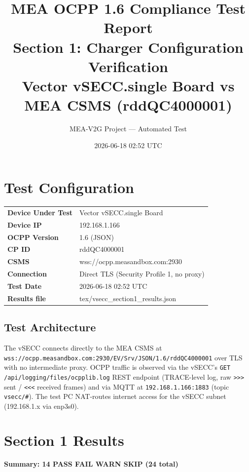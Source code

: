 \documentclass[10pt, a4paper]{article}
\title{\textbf{MEA OCPP 1.6 Compliance Test Report}\\[0.3em]
\large Section 1: Charger Configuration Verification\\[0.3em]
\normalsize Vector vSECC.single Board vs MEA CSMS (rddQC4000001)}
\author{MEA-V2G Project --- Automated Test}
\date{2026-06-18 02:52 UTC}
\begin{document}
\maketitle
\tableofcontents
\newpage

\section{Test Configuration}
\begin{tabular}{ll}
\textbf{Device Under Test} & Vector vSECC.single Board \\
\textbf{Device IP}         & 192.168.1.166 \\
\textbf{OCPP Version}      & 1.6 (JSON) \\
\textbf{CP ID}             & rddQC4000001 \\
\textbf{CSMS}              & wss://ocpp.measandbox.com:2930 \\
\textbf{Connection}        & Direct TLS (Security Profile 1, no proxy) \\
\textbf{Test Date}         & 2026-06-18 02:52 UTC \\
\textbf{Results file}      & tex/vsecc\_section1\_results.json \\
\end{tabular}

\subsection*{Test Architecture}
The vSECC connects directly to the MEA CSMS at
\texttt{wss://ocpp.measandbox.com:2930/EV/Srv/JSON/1.6/rddQC4000001}
over TLS with no intermediate proxy.
OCPP traffic is observed via the vSECC's \texttt{GET /api/logging/files/ocpplib.log}
REST endpoint (TRACE-level log, raw \texttt{>>>} sent / \texttt{<<<} received frames)
and via MQTT at \texttt{192.168.1.166:1883} (topic \texttt{vsecc/\#}).
The test PC NAT-routes internet access for the vSECC subnet (192.168.1.x via enp3s0).

\section{Section 1 Results}
\textbf{Summary: 14 PASS  FAIL  WARN  SKIP \quad (24 total)}
\end{document}
